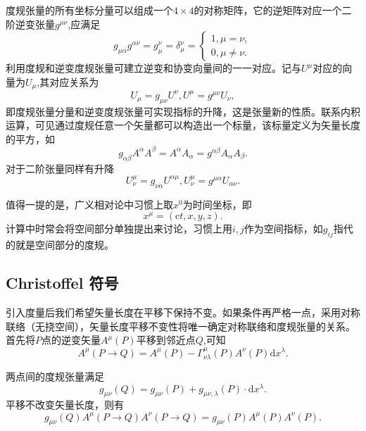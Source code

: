 \documentclass[11pt, a4paper, oneside, onecolumn]{ctexart}
\numberwithin{equation}{subsection}
\begin{document}
度规张量的所有坐标分量可以组成一个$4\times4$的对称矩阵，它的逆矩阵对应一个二阶逆变张量$g^{\mu\nu}$,应满足
\begin{equation}
g_{\mu\alpha}g^{\alpha\nu}=g^{\nu}_{\mu}=\delta{}_{\mu}^{\nu}=
\begin{cases}
1,\mu=\nu,\\
0,\mu\ne\nu.
\end{cases}
\end{equation}
利用度规和逆变度规张量可建立逆变和协变向量间的一一对应。记与$U^{\mu}$对应的向量为$U_{\mu}$,其对应关系为
\begin{equation}
U_{\mu}=g_{\mu\nu}U^{\nu},U^{\mu}=g^{\mu\nu}U_{\nu},
\end{equation}
即度规张量分量和逆变度规张量可实现指标的升降，这是张量新的性质。联系内积运算，可见通过度规任意一个矢量都可以构造出一个标量，该标量定义为矢量长度的平方，如
\begin{equation}
g_{\alpha\beta}A^{\alpha}A^{\beta}=A^{\alpha}A_{\alpha}=g^{\alpha\beta}A_{\alpha}A_{\beta}.
\end{equation}
对于二阶张量同样有升降
\begin{equation}
U_{\nu}^{\mu}=g_{\nu\alpha}U^{\alpha\mu},U_{\nu}^{\mu}=g^{\mu\alpha}U_{\alpha\nu}.
\end{equation}

值得一提的是，广义相对论中习惯上取$x^{0}$为时间坐标，即
\begin{equation}
x^{\mu}=\left(\mathrm{c}t,x,y,z\right).
\end{equation}
计算中时常会将空间部分单独提出来讨论，习惯上用$i,j$作为空间指标，如$g_{ij}$指代的就是空间部分的度规。

\subsection{Christoffel 符号}
引入度量后我们希望矢量长度在平移下保持不变。如果条件再严格一点，采用对称联络（无挠空间），矢量长度平移不变性将唯一确定对称联络和度规张量的关系。首先将$P$点的逆变矢量$A^{\mu}\left(P\right)$平移到邻近点$Q$,可知
\begin{equation}
A^{\mu}\left(P\to Q\right)=A^{\mu}\left(P\right)-\Gamma_{\nu\lambda}^{\mu}\left(P\right)A^{\nu}\left(P\right)\mathrm{d}x^{\lambda}.\label{1.7.1}
\end{equation}

两点间的度规张量满足
\begin{equation}
g_{\mu\nu}\left(Q\right)=g_{\mu\nu}\left(P\right)+g_{\mu\nu,\lambda}\left(P\right)\cdot\mathrm{d}x^{\lambda}.\label{1.7.2}
\end{equation}
平移不改变矢量长度，则有
\begin{equation}
g_{\mu\nu}\left(Q\right)A^{\mu}\left(P\to Q\right)A^{\nu}\left(P\to Q\right)=g_{\mu\nu}\left(P\right)A^{\mu}\left(P\right)A^{\nu}\left(P\right).\label{1.7.3}
\end{equation}
\end{document}
